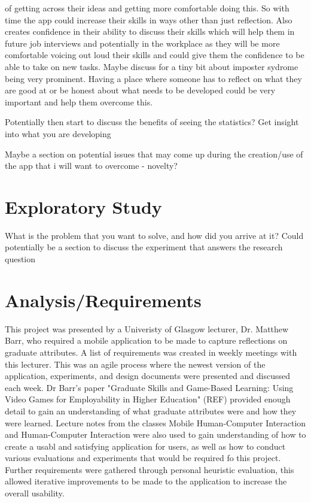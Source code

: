 \documentclass{l4proj}
\begin{document}
of getting across their ideas and getting more comfortable doing this. So with time the app could increase their
skills in ways other than just reflection. Also creates confidence in their ability to discuss their 
skills which will help them in future job interviews and potentially in the workplace as they will be more 
comfortable voicing out loud their skills and could give them the confidence to be able to take on new tasks.
Maybe discuss for a tiny bit about imposter sydrome being very prominent. Having a place where someone has to 
reflect on what they are good at or be honest about what needs to be developed could be very important and
help them overcome this. 
\par 
Potentially then start to discuss the benefits of seeing the statistics? Get insight into what you are 
developing
\par 
Maybe a section on potential issues that may come up during the creation/use of the app that i will want to 
overcome - novelty? 


\chapter{Exploratory Study} \label{ExploratoryStudy}
What is the problem that you want to solve, and how did you arrive at it?
Could potentially be a section to discuss the experiment that answers the research question 


\chapter{Analysis/Requirements}

This project was presented by a Univeristy of Glasgow lecturer, Dr. Matthew Barr, who required a mobile application to be made 
to capture reflections on graduate attributes. A list of requirements was created in weekly meetings with this lecturer.
This was an agile process where the newest version of the application, experiments, and design documents were presented
and discussed each week. Dr Barr's paper "Graduate Skills and Game-Based Learning: Using Video Games for Employability in Higher 
Education" (REF) provided enough detail to gain an understanding of what graduate attributes were and how they were learned. 
Lecture notes from the classes Mobile Human-Computer Interaction and Human-Computer Interaction were also used to gain understanding
of how to create a usabl and satisfying application for users, as well as how to conduct various evaluations and experiments that would
be required fo this project.
Further requirements were gathered through personal heuristic evaluation, this allowed iterative improvements to be made to the
application to increase the overall usability.
\end{document}
